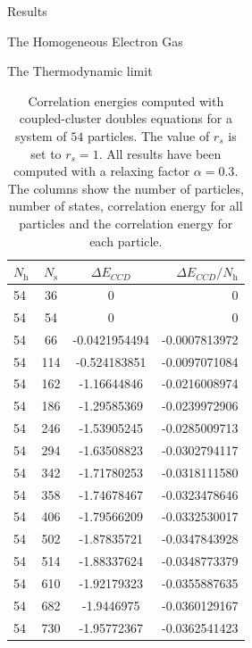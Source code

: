 \documentclass[twoside,english]{uiofysmaster}
\begin{document}
\begin{chapter}{Results}
\begin{section}{The Homogeneous Electron Gas}
\begin{subsection}{The Thermodynamic limit}
			\begin{table}[H]
				\begin{center}
					\begin{tabular}[center]{l  c  c r}
						$N_{\text{h}}$ & $N_{\text{s}}$ & $\Delta E_{CCD}$ & $\Delta E_{CCD}/N_{\text{h}}$ \\
						\hline
						54 & 36 & 0 & 0 \\
						54 & 54 & 0 & 0 \\
						54 &  66 & -0.0421954494 &-0.0007813972\\
						54 &  114 & -0.524183851 &-0.0097071084  \\
						54 &  162 & -1.16644846  &-0.0216008974 \\
						54 & 186 & -1.29585369   &-0.0239972906 \\
						54 & 246 & -1.53905245   &-0.0285009713 \\
						54 & 294 & -1.63508823   &-0.0302794117 \\
						54 & 342 & -1.71780253   &-0.0318111580 \\
						54 & 358 & -1.74678467   &-0.0323478646 \\
						54 & 406 & -1.79566209   &-0.0332530017 \\
						54 & 502 & -1.87835721   &-0.0347843928 \\
						54 & 514 & -1.88337624   &-0.0348773379 \\
						54 & 610 & -1.92179323   &-0.0355887635 \\
						54 & 682 & -1.9446975    &-0.0360129167 \\
						54 & 730 & -1.95772367   &-0.0362541423 
					\end{tabular}
				\end{center}
				\caption{Correlation energies computed with coupled-cluster doubles equations for a system of $54$ particles. The value of $r_s$ is set to $r_s=1$. All results have been computed with a relaxing factor $\alpha=0.3$. The columns show the number of particles, number of states, correlation energy for all particles and the correlation energy for each particle.}
				\label{table:ThermodynamicLimit3}
			\end{table}


\end{subsection}
\end{section}
\end{chapter}
\end{document}
